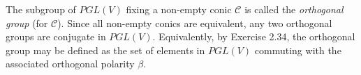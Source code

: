 The subgroup of $PGL(V)$ fixing a non-empty conic $\mathcal{C}$ is called the \textit{orthogonal group} (for $\mathcal{C}$). Since all non-empty conics are equivalent, any two orthogonal groups are conjugate in $PGL(V)$. Equivalently, by Exercise 2.34, the orthogonal group may be defined as the set of elements in $PGL(V)$ commuting with the associated orthogonal polarity $\beta$.
